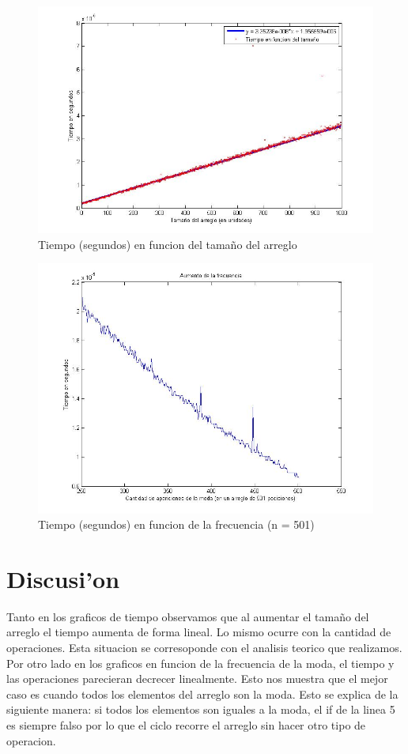 \begin{figure}[H]
\centering
\includegraphics[scale=0.5]{../../codigo/ejercicio3/benchmark_de_tiempo/graficos/moda-1000-casos.jpg}
\caption{Tiempo (segundos) en funcion del tama\~{n}o del arreglo}
\end{figure}

\begin{figure}[H]
\centering
\includegraphics[scale=0.5]{../../codigo/ejercicio3/benchmark_de_tiempo/graficos/aumento-frecuencia.jpg}
\caption{Tiempo (segundos) en funcion de la frecuencia (n = 501)}
\end{figure}

\section{Discusi'on}
Tanto en los graficos de tiempo observamos que al aumentar el tama\~{n}o del arreglo el tiempo aumenta de forma lineal. Lo mismo ocurre con la cantidad de operaciones. Esta situacion se corresoponde con el analisis teorico que realizamos.
Por otro lado en los graficos en funcion de la frecuencia de la moda, el tiempo y las operaciones parecieran decrecer linealmente. Esto nos muestra que el mejor caso es cuando todos los elementos del arreglo son la moda. Esto se explica de la siguiente manera: si todos los elementos son iguales a la moda, el if de la linea 5 es siempre falso por lo que el ciclo recorre el arreglo sin hacer otro tipo de operacion.
